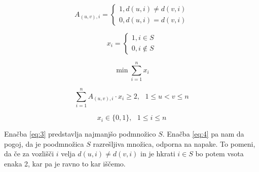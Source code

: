 \documentclass[a4paper,10pt, fleqn]{article}
\begin{document}
\begin{equation}
    A_{(u, v), i} = \begin{cases}
        1, d(u, i) \neq d(v, i) \\
        0, d(u, i) = d(v, i)
    \end{cases}
\label{eq:1}
\end{equation}

\begin{equation}
    x_i = \begin{cases}
        1, i \in S \\
        0, i \notin S
    \end{cases}
\label{eq:2}
\end{equation} %

\begin{equation}
    \min \sum_{i = 1}^{n} x_i  
\label{eq:3}
\end{equation}

\begin{equation}
    \sum_{i = 1}^{n} A_{(u, v), i} \cdot x_i \geq 2, \text{ } 1 \leq u < v \leq n 
\label{eq:4}
\end{equation}

\begin{equation}
    x_i \in \{0, 1\}, \text{ } 1 \leq i \leq n
\label{eq:5}
\end{equation}

Enačba \eqref{eq:3} predstavlja najmanjšo podmnožico $S.$ Enačba \eqref{eq:4} pa nam da pogoj, da
je poodmnožica $S$ razrešljiva množica, odporna na napake. To pomeni, da če za vozlišči $i$ velja 
$d(u, i) \neq d(v, i)$ in je hkrati $i \in S$ bo potem vsota enaka 2, kar pa je ravno to kar iščemo.
\end{document}
